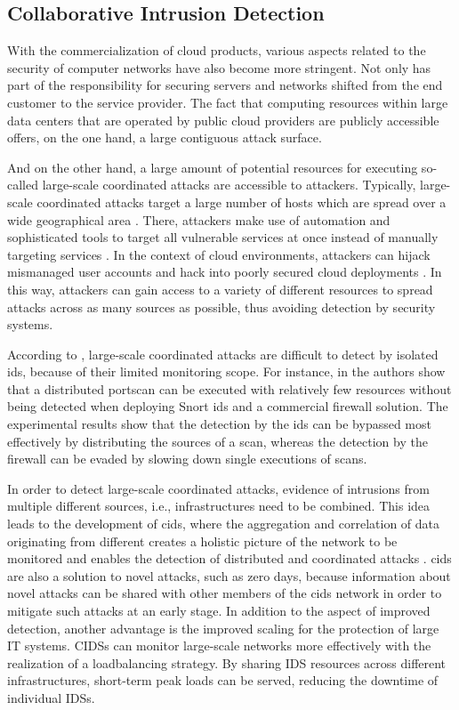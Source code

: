 \subsection{Collaborative Intrusion Detection}
With the commercialization of cloud products, various aspects related to the security of computer networks have also become more stringent. Not only has part of the responsibility for securing servers and networks shifted from the end customer to the service provider. The fact that computing resources within large data centers that are operated by public cloud providers are publicly accessible offers, on the one hand, a large contiguous attack surface.

And on the other hand, a large amount of potential resources for executing so-called large-scale coordinated attacks are accessible to attackers. 
Typically, large-scale coordinated attacks target a large number of hosts which are spread over a wide geographical area \cite{Zhou2010}.
There, attackers make use of automation and sophisticated tools to target all vulnerable services at once instead of manually targeting services \cite{savage2005}. In the context of cloud environments, attackers can hijack mismanaged user accounts and hack into poorly secured cloud deployments \cite{kumar2019}. In this way, attackers can gain access to a variety of different resources to spread attacks across as many sources as possible, thus avoiding detection by security systems.

According to \cite{Zhou2010}, large-scale coordinated attacks are difficult to detect by isolated \gls{ids}, because of their limited monitoring scope. For instance, in \cite{riquet2012large} the authors show that a distributed portscan can be executed with relatively few resources without being detected when deploying Snort \gls{ids} and a commercial firewall solution. The experimental results show that the detection by the \gls{ids} can be bypassed most effectively by distributing the sources of a scan, whereas the detection by the firewall can be evaded by slowing down single executions of scans. 

In order to detect large-scale coordinated attacks, evidence of intrusions from multiple different sources, i.e., infrastructures need to be combined. This idea leads to the development of \gls{cids}, where the aggregation and correlation of data originating from different  creates a holistic picture of the network to be monitored and enables the detection of distributed and coordinated attacks \cite[24]{vasilomanolakis_collaborative_2016}. \gls{cids} are also a solution to novel attacks, such as zero days, because information about novel attacks can be shared with other members of the \gls{cids} network in order to mitigate such attacks at an early stage. In addition to the aspect of improved detection, another advantage is the improved scaling for the protection of large IT systems. CIDSs can monitor large-scale networks more effectively with the realization of a loadbalancing strategy. By sharing IDS resources across different infrastructures, short-term peak loads can be served, reducing the downtime of individual IDSs.

